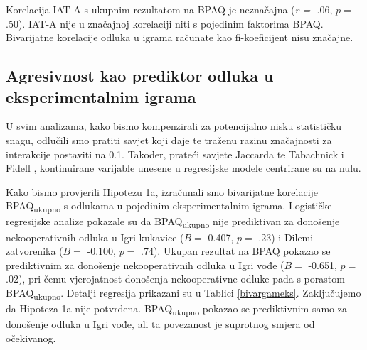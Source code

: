 \documentclass[a4paper, 12pt]{report}
\newcommand{\mti}[1]{\textit{#1}}
\begin{document}
Korelacija IAT-A s ukupnim rezultatom na
BPAQ je neznačajna (\mti{r =} -.06, $p =$ .50). IAT-A nije u značajnoj korelaciji
niti s pojedinim faktorima BPAQ.
Bivarijatne korelacije odluka u igrama računate
kao fi-koeficijent nisu značajne.

\subsection{Agresivnost kao prediktor odluka u eksperimentalnim igrama}

U svim analizama, kako bismo kompenzirali za potencijalno nisku statističku
snagu, odlučili smo pratiti savjet koji daje 
\citet{aguinis1995statistical} te traženu razinu značajnosti za interakcije
postaviti na 0.1. Također, prateći savjete Jaccarda
\citeyearpar{jaccard2001interaction} te Tabachnick i Fidell
\citeyearpar{tabachnick2012multi}, kontinuirane varijable unesene u regresijske
modele centrirane su na nulu. 

Kako bismo provjerili Hipotezu 1a, izračunali smo bivarijatne korelacije BPAQ\textsubscript{ukupno}
s odlukama u pojedinim eksperimentalnim igrama. Logističke regresijske analize
pokazale su da BPAQ\textsubscript{ukupno} nije prediktivan za donošenje
nekooperativnih odluka u
Igri kukavice ($B =$ 0.407, $p =$ .23) i Dilemi zatvorenika ($B =$ -0.100, $p
=$ .74). Ukupan rezultat na BPAQ pokazao se prediktivnim za donošenje
nekooperativnih odluka u Igri vođe ($B =$ -0.651, $p =$ .02), pri čemu
vjerojatnost donošenja nekooperativne odluke pada s porastom
BPAQ\textsubscript{ukupno}. Detalji regresija prikazani su u Tablici
\ref{bivargameks}. 
Zaključujemo da Hipoteza 1a nije potvrđena. BPAQ\textsubscript{ukupno} pokazao se prediktivnim
samo za donošenje odluka u Igri vođe, ali ta povezanost je suprotnog smjera od
očekivanog.
\end{document}
